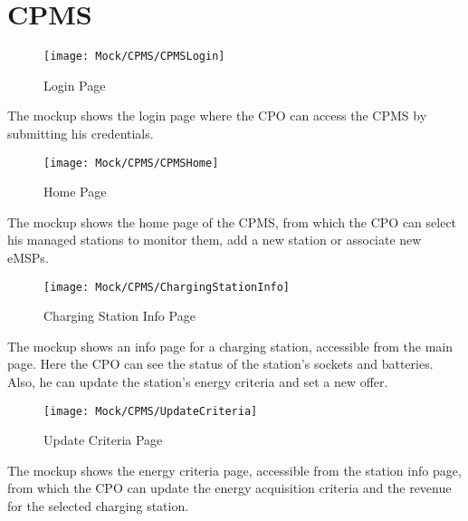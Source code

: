 \section{CPMS}
\vspace{4cm}
\begin{figure}[H]
    \begin{center}
    \texttt{[image: Mock/CPMS/CPMSLogin]}
    \caption{Login Page}
    \label{fig:CPMSLogin}
    \end{center}
\end{figure}
The mockup shows the login page where the CPO can access the CPMS by submitting his credentials.
\newpage
\begin{preface}
\begin{figure}[H]
    \begin{center}
    \texttt{[image: Mock/CPMS/CPMSHome]}
    \caption{Home Page}
    \label{fig:CPMSHome}
    \end{center}
\end{figure}
The mockup shows the home page of the CPMS, from which the CPO can select his managed stations to monitor them, add a new station or associate new eMSPs.
\end{preface}
\newpage
\begin{preface}
\begin{figure}[H]
    \begin{center}
    \texttt{[image: Mock/CPMS/ChargingStationInfo]}
    \caption{Charging Station Info Page}
    \label{fig:ChargingStationInfo}
    \end{center}
\end{figure}
The mockup shows an info page for a charging station, accessible from the main page. Here the CPO can see the status of the station's sockets and batteries. Also, he can update the station's energy criteria and set a new offer.
\end{preface}
\newpage
\begin{preface}
\begin{figure}[H]
    \begin{center}
    \texttt{[image: Mock/CPMS/UpdateCriteria]}
    \caption{Update Criteria Page}
    \label{fig:CPMSLogin}
    \end{center}
\end{figure}
The mockup shows the energy criteria page, accessible from the station info page, from which the CPO can update the energy acquisition criteria and the revenue for the selected charging station.
\end{preface}
